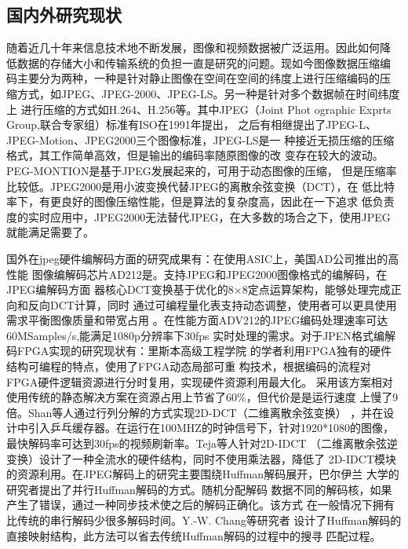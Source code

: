 \documentclass{article}
\numberwithin {equation}{section}
\begin{document}
\begin{spacing}{1.25}
  \subsection{国内外研究现状}
    \vspace{1em}
    随着近几十年来信息技术地不断发展，图像和视频数据被广泛运用。因此如何降
    低数据的存储大小和传输系统的负担一直是研究的问题。现如今图像数据压缩编
    码主要分为两种，一种是针对静止图像在空间在空间的纬度上进行压缩编码的压
    缩方式，如JPEG、JPEG-2000、JPEG-LS。另一种是针对多个数据帧在时间纬度上
    进行压缩的方式如H.264、H.256\cite{sze2014high}等。其中JPEG（Joint Phot
    ographic Exprts Group,联合专家组）标准有ISO在1991年提出\cite{pennebaker1992jpeg}，
    之后有相继提出了JPEG-L、JPEG-Motion、JPEG2000三个图像标准，JPEG-LS是一
    种接近无损压缩的压缩格式，其工作简单高效，但是输出的编码率随原图像的改
    变存在较大的波动。PEG-MONTION是基于JPEG发展起来的，可用于动态图像的压缩，
    但是压缩率比较低。JPEG2000是用小波变换代替JPEG的离散余弦变换（DCT），在
    低比特率下，有更良好的图像压缩性能，但是算法的复杂度高，因此在一下追求
    低负责度的实时应用中，JPEG2000无法替代JPEG，在大多数的场合之下，使用JPEG
    就能满足需要了。

    国外在jpeg硬件编解码方面的研究成果有：在使用ASIC上，美国AD公司推出的高性能
    图像编解码芯片AD212是。支持JPEG和JPEG2000图像格式的编解码，在JPEG编解码方面
    器核心DCT变换基于优化的8×8定点运算架构，能够处理完成正向和反向DCT计算，同时
    通过可编程量化表支持动态调整，使用者可以更具使用需求平衡图像质量和带宽占用
    。在性能方面ADV212的JPEG编码处理速率可达60MSamples/s,能满足1080p分辨率下30fps
    实时处理的需求。对于JPEN格式编解码FPGA实现的研究现状有：里斯本高级工程学院
    的学者\cite{ref10}利用FPGA独有的硬件结构可编程的特点，使用了FPGA动态局部可重
    构技术，根据编码的流程对FPGA硬件逻辑资源进行分时复用，实现硬件资源利用最大化。
    采用该方案相对使用传统的静态解决方案在资源占用上节省了60\%，但代价是是运行速度
    上慢了9倍。Shan等人\cite{ref11}通过行列分解的方式实现2D-DCT（二维离散余弦变换）
    ，并在设计中引入乒乓缓存器。在运行在100MHZ的时钟信号下，针对1920*1080的图像，
    最快解码率可达到30fps的视频刷新率。Teja\cite{teja2015verilog}等人针对2D-IDCT
    （二维离散余弦逆变换）设计了一种全流水的硬件结构，同时不使用乘法器，降低了
    2D-IDCT模块的资源利用。在JPEG解码上的研究主要围绕Huffman解码展开，巴尔伊兰
    大学的研究者\cite{klein2003parallel}提出了并行Huffman解码的方式。随机分配解码
    数据不同的解码核，如果产生了错误，通过一种同步技术使之后的解码正确化。该方式
    在一般情况下拥有比传统的串行解码少很多解码时间。Y.-W. Chang等研究者\cite{chang2006direct}
    设计了Huffman解码的直接映射结构，此方法可以省去传统Huffman解码的过程中的搜寻
    匹配过程。


\end{spacing}
\end{document}
